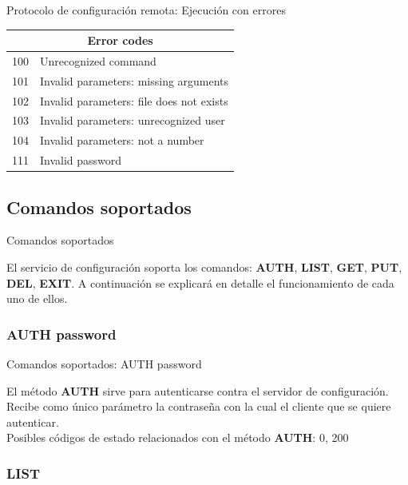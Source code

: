 \documentclass{beamer}
\begin{document}
\begin{frame}{Protocolo de configuración remota: Ejecución con errores}

\begin{tabular}{|l|l|}
  \hline
  \multicolumn{2}{|c|}{Error codes} \\
  \hline
  \hline
  100 & Unrecognized command \\
  101 & Invalid parameters: missing arguments \\
  102 & Invalid parameters: file does not exists \\
  103 & Invalid parameters: unrecognized user \\
  104 & Invalid parameters: not a number \\
  111 & Invalid password \\
  \hline
\end{tabular}
\end{frame}


\subsection{Comandos soportados}

\begin{frame}{Comandos soportados}
\par El servicio de configuración soporta los comandos: \textbf{AUTH}, \textbf{LIST}, \textbf{GET}, \textbf{PUT}, \textbf{DEL}, \textbf{EXIT}. A continuación se explicará en detalle el funcionamiento de cada uno de ellos.

\end{frame}


\subsubsection{AUTH password}
\begin{frame}{Comandos soportados: AUTH password}

\par El método \textbf{AUTH} sirve para autenticarse contra el servidor de configuración. Recibe como único parámetro la contraseña con la cual el cliente que se quiere autenticar.\\[0.5cm]
Posibles códigos de estado relacionados con el método \textbf{AUTH}: 0, 200
\end{frame}

\subsubsection{LIST}
\end{document}
